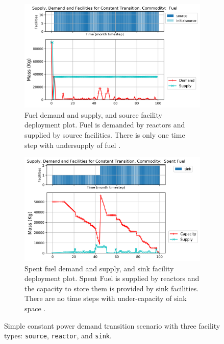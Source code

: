     \begin{figure}[]
        \centering
        \begin{subfigure}[t]{1\textwidth}
            \centering
            \includegraphics[width=0.9\linewidth]{figures/constanttransition-fuel.png} 
            \caption{Fuel demand and supply, and source facility deployment plot.
            Fuel is demanded by reactors and supplied by source facilities.
            There is only one time step with undersupply of fuel \cite{chee_arfc/transition-scenarios_2018}.}
            \label{fig:constanttransition-fuel}
        \end{subfigure}
        \begin{subfigure}[t]{1\textwidth}
            \centering
            \includegraphics[width=0.9\linewidth]{figures/constanttransition-spentfuel.png} 
            \caption{Spent fuel demand and supply, and sink facility deployment plot.
                Spent Fuel is supplied by reactors and the capacity to store them 
                is provided by sink facilities.
            There are no time steps with under-capacity of sink space \cite{chee_arfc/transition-scenarios_2018}.}
            \label{fig:constanttransition-spentfuel}
        \end{subfigure}
        \caption{Simple constant power demand transition scenario with 
        three facility types: \texttt{source}, \texttt{reactor}, and \texttt{sink}.}
    \end{figure}

